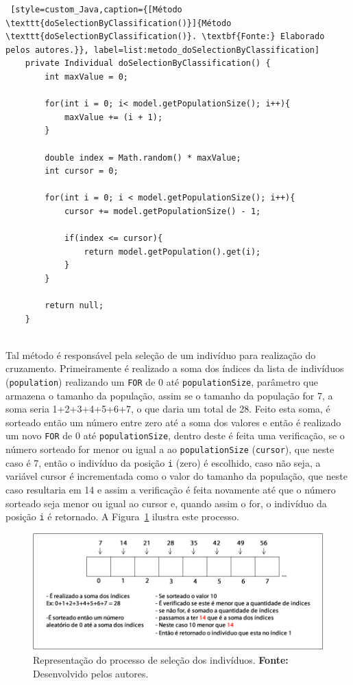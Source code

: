 \begin{lstlisting} [style=custom_Java,caption={[Método \texttt{doSelectionByClassification()}]{Método \texttt{doSelectionByClassification()}. \textbf{Fonte:} Elaborado pelos autores.}}, label=list:metodo_doSelectionByClassification] 
	private Individual doSelectionByClassification() {
		int maxValue = 0;
		
		for(int i = 0; i< model.getPopulationSize(); i++){
			maxValue += (i + 1);
		}
		
		double index = Math.random() * maxValue;
		int cursor = 0;
		
		for(int i = 0; i < model.getPopulationSize(); i++){
			cursor += model.getPopulationSize() - 1;
			
			if(index <= cursor){
				return model.getPopulation().get(i);
			}
		}
		
		return null;
	}


\end{lstlisting}

\par Tal método é responsável pela seleção de um indivíduo para realização do cruzamento. Primeiramente
é realizado a soma dos índices da lista de indivíduos (\texttt{population}) realizando um \texttt{FOR} de 0 até
\texttt{populationSize}, parâmetro que armazena o tamanho da população, assim se o tamanho da população for
7, a soma seria 1+2+3+4+5+6+7, o que daria um total de 28. Feito esta soma, é sorteado então um número 
entre zero até a soma dos valores e então é realizado um novo \texttt{FOR} de 0 até \texttt{populationSize},
dentro deste é feita uma verificação, se o número sorteado for menor ou igual 
a ao \texttt{populationSize} (\texttt{cursor}), que neste caso é 7, então o indivíduo da posição \texttt{i} (zero) é escolhido, 
caso não seja, a variável cursor é incrementada como o valor do tamanho da população, que neste caso resultaria 
em 14 e assim a verificação é feita novamente até que o número sorteado seja menor ou igual ao cursor e, quando assim
o for, o indivíduo da posição \texttt{i} é retornado. A Figura~\ref{fig:ex_selecao} ilustra este processo.

\begin{figure}[h!]
	\centerline{\includegraphics[scale=0.7]{./imagens/selecao.png}}
	\caption[Representação do processo de seleção dos indivíduos.]
	{Representação do processo de seleção dos indivíduos.
		\textbf{Fonte:} Desenvolvido pelos autores.}
	\label{fig:ex_selecao}
\end{figure}

